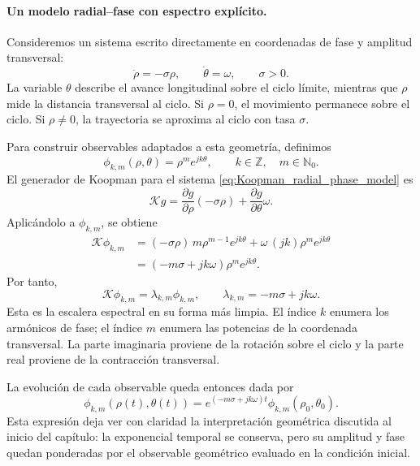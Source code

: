 \paragraph{Un modelo radial--fase con espectro explícito.}
Consideremos un sistema escrito directamente en coordenadas de fase y amplitud transversal:
\begin{equation}
\dot{\rho}=-\sigma \rho,
\qquad
\dot{\theta}=\omega,
\qquad \sigma>0.
\label{eq:Koopman_radial_phase_model}
\end{equation}
La variable \(\theta\) describe el avance longitudinal sobre el ciclo límite, mientras que \(\rho\) mide la distancia transversal al ciclo. Si \(\rho=0\), el movimiento permanece sobre el ciclo. Si \(\rho\neq 0\), la trayectoria se aproxima al ciclo con tasa \(\sigma\).

Para construir observables adaptados a esta geometría, definimos
\begin{equation}
\phi_{k,m}(\rho,\theta)=\rho^m e^{jk\theta},
\qquad
k\in\mathbb{Z},\quad m\in\mathbb{N}_0.
\label{eq:Koopman_radial_phase_observable}
\end{equation}
El generador de Koopman para el sistema \eqref{eq:Koopman_radial_phase_model} es
\begin{equation}
\mathcal{K}g
=
\frac{\partial g}{\partial \rho}(-\sigma\rho)
+
\frac{\partial g}{\partial \theta}\omega.
\label{eq:Koopman_radial_phase_generator}
\end{equation}
Aplicándolo a \(\phi_{k,m}\), se obtiene
\begin{align}
\mathcal{K}\phi_{k,m}
&=
(-\sigma\rho)\,m\rho^{m-1}e^{jk\theta}
+
\omega\,(jk)\rho^m e^{jk\theta}
\\[1mm]
&=
(-m\sigma+jk\omega)\rho^m e^{jk\theta}.
\end{align}
Por tanto,
\begin{equation}
\mathcal{K}\phi_{k,m}
=
\lambda_{k,m}\phi_{k,m},
\qquad
\lambda_{k,m}=-m\sigma+jk\omega.
\label{eq:Koopman_radial_phase_ladder_exact}
\end{equation}
Esta es la escalera espectral en su forma más limpia. El índice \(k\) enumera los armónicos de fase; el índice \(m\) enumera las potencias de la coordenada transversal. La parte imaginaria proviene de la rotación sobre el ciclo y la parte real proviene de la contracción transversal.

La evolución de cada observable queda entonces dada por
\begin{equation}
\phi_{k,m}(\rho(t),\theta(t))
=
e^{(-m\sigma+jk\omega)t}\phi_{k,m}(\rho_0,\theta_0).
\label{eq:Koopman_radial_phase_evolution_exact}
\end{equation}
Esta expresión deja ver con claridad la interpretación geométrica discutida al inicio del capítulo: la exponencial temporal se conserva, pero su amplitud y fase quedan ponderadas por el observable geométrico evaluado en la condición inicial.

